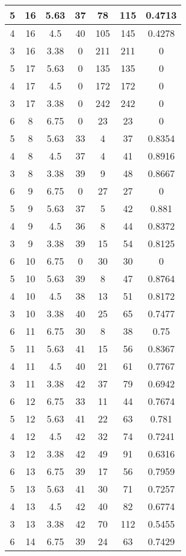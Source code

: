 \documentclass[letterpaper, 12pt]{article}
\begin{document}
\begin{longtable}{|c|c|c|c|c|c|c|}
\hline
5 & 16 & 5.63 & 37 & 78 & 115 & 0.4713 \\
\hline
4 & 16 & 4.5 & 40 & 105 & 145 & 0.4278 \\
\hline
3 & 16 & 3.38 & 0 & 211 & 211 & 0 \\
\hline
5 & 17 & 5.63 & 0 & 135 & 135 & 0 \\
\hline
4 & 17 & 4.5 & 0 & 172 & 172 & 0 \\
\hline
3 & 17 & 3.38 & 0 & 242 & 242 & 0 \\
\hline
6 & 8 & 6.75 & 0 & 23 & 23 & 0 \\
\hline
5 & 8 & 5.63 & 33 & 4 & 37 & 0.8354 \\
\hline
4 & 8 & 4.5 & 37 & 4 & 41 & 0.8916 \\
\hline
3 & 8 & 3.38 & 39 & 9 & 48 & 0.8667 \\
\hline
6 & 9 & 6.75 & 0 & 27 & 27 & 0 \\
\hline
5 & 9 & 5.63 & 37 & 5 & 42 & 0.881 \\
\hline
4 & 9 & 4.5 & 36 & 8 & 44 & 0.8372 \\
\hline
3 & 9 & 3.38 & 39 & 15 & 54 & 0.8125 \\
\hline
6 & 10 & 6.75 & 0 & 30 & 30 & 0 \\
\hline
5 & 10 & 5.63 & 39 & 8 & 47 & 0.8764 \\
\hline
4 & 10 & 4.5 & 38 & 13 & 51 & 0.8172 \\
\hline
3 & 10 & 3.38 & 40 & 25 & 65 & 0.7477 \\
\hline
6 & 11 & 6.75 & 30 & 8 & 38 & 0.75 \\
\hline
5 & 11 & 5.63 & 41 & 15 & 56 & 0.8367 \\
\hline
4 & 11 & 4.5 & 40 & 21 & 61 & 0.7767 \\
\hline
3 & 11 & 3.38 & 42 & 37 & 79 & 0.6942 \\
\hline
6 & 12 & 6.75 & 33 & 11 & 44 & 0.7674 \\
\hline
5 & 12 & 5.63 & 41 & 22 & 63 & 0.781 \\
\hline
4 & 12 & 4.5 & 42 & 32 & 74 & 0.7241 \\
\hline
3 & 12 & 3.38 & 42 & 49 & 91 & 0.6316 \\
\hline
6 & 13 & 6.75 & 39 & 17 & 56 & 0.7959 \\
\hline
5 & 13 & 5.63 & 41 & 30 & 71 & 0.7257 \\
\hline
4 & 13 & 4.5 & 42 & 40 & 82 & 0.6774 \\
\hline
3 & 13 & 3.38 & 42 & 70 & 112 & 0.5455 \\
\hline
6 & 14 & 6.75 & 39 & 24 & 63 & 0.7429 \\

\end{longtable}
\end{document}
